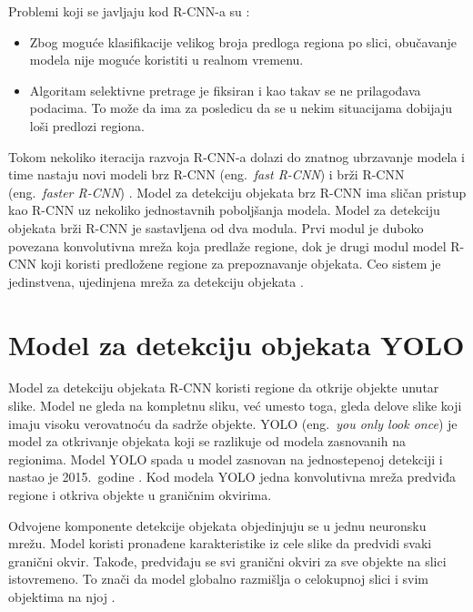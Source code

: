 \documentclass[12pt,oneside]{memoir}
\begin{document}
Problemi koji se javljaju kod R-CNN-a su \cite{gandhi_2018}:
\begin{itemize}
    \item Zbog moguće klasifikacije velikog broja predloga regiona po slici, obučavanje modela nije moguće koristiti u realnom vremenu.
    \item Algoritam selektivne pretrage je fiksiran i kao takav se ne prilagođava podacima. To može da ima za posledicu da se u nekim situacijama dobijaju loši predlozi regiona.
\end{itemize}

Tokom nekoliko iteracija razvoja R-CNN-a dolazi do znatnog ubrzavanje modela i time nastaju novi modeli brz R-CNN (eng.~\textit{fast R-CNN}) \cite{girshick2015fast} i brži R-CNN (eng.~\textit{faster R-CNN}) \cite{ren2015faster}.  Model za detekciju objekata brz R-CNN ima sličan pristup kao R-CNN uz nekoliko jednostavnih poboljšanja modela. Model za detekciju objekata brži R-CNN  je sastavljena od dva modula. Prvi modul je duboko povezana konvolutivna mreža koja predlaže regione, dok je drugi modul model R-CNN koji koristi predložene regione za prepoznavanje objekata. Ceo sistem je jedinstvena, ujedinjena mreža za detekciju objekata \cite{ren2015faster}.


\section{Model za detekciju objekata YOLO}
Model za detekciju objekata R-CNN koristi regione da otkrije objekte unutar slike. Model ne gleda na kompletnu sliku, već umesto toga, gleda delove slike koji imaju visoku verovatnoću da sadrže objekte. YOLO (eng.~\textit{you only look once}) je model za otkrivanje objekata koji se razlikuje od modela zasnovanih na regionima. Model YOLO spada u model zasnovan na jednostepenoj detekciji i nastao je 2015.~godine \cite{redmon2016you}. Kod modela YOLO jedna konvolutivna mreža predviđa regione i otkriva objekte u graničnim okvirima.

Odvojene komponente detekcije objekata objedinjuju se u jednu neuronsku mrežu. Model koristi pronađene karakteristike iz cele slike da predvidi svaki granični okvir. Takođe, predviđaju se svi granični okviri za sve objekte na slici istovremeno. To znači da model globalno razmišlja o celokupnoj slici i svim objektima na njoj \cite{redmon2016you}.


\end{document}
